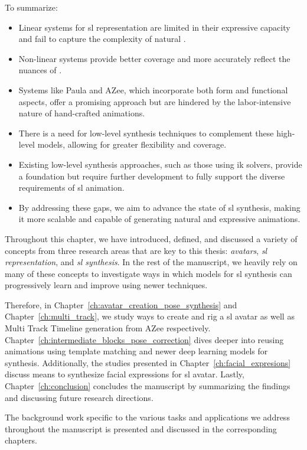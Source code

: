\documentclass[../../main.tex]{subfiles}
\begin{document}
To summarize:

\begin{itemize} 
  \item Linear systems for \gls{sl} representation are limited in their expressive capacity and fail to capture the complexity of natural .
  \item Non-linear systems provide better coverage and more accurately reflect the nuances of .
  \item Systems like Paula and AZee, which incorporate both form and functional aspects, offer a promising approach but are hindered by the labor-intensive nature of hand-crafted animations.
  \item There is a need for low-level synthesis techniques to complement these high-level models, allowing for greater flexibility and coverage.
  \item Existing low-level synthesis approaches, such as those using \gls{ik} solvers, provide a foundation but require further development to fully support the diverse requirements of \gls{sl} animation.
  \item By addressing these gaps, we aim to advance the state of \gls{sl} synthesis, making it more scalable and capable of generating natural and expressive animations.
\end{itemize}

Throughout this chapter, we have introduced, defined, and discussed a variety of concepts from three research areas that are key to this thesis: \textit{avatars}, \textit{\gls{sl} representation}, and \textit{\gls{sl} synthesis}. In the rest of the manuscript, we heavily rely on many of these concepts to investigate ways in which models for \gls{sl} synthesis can progressively learn and improve using newer techniques.

Therefore, in Chapter~\ref{ch:avatar_creation_pose_synthesis} and Chapter~\ref{ch:multi_track}, we study ways to create and rig a \gls{sl} avatar as well as Multi Track Timeline generation from AZee respectively. Chapter~\ref{ch:intermediate_blocks_pose_correction} dives deeper into reusing animations using template matching and newer deep learning models for synthesis. Additionally, the studies presented in Chapter~\ref{ch:facial_expresions} discuss means to synthesize facial expressions for \gls{sl} avatar. Lastly, Chapter~\ref{ch:conclusion} concludes the manuscript by summarizing the findings and discussing future research directions.

The background work specific to the various tasks and applications we address throughout the manuscript is presented and discussed in the corresponding chapters.
\end{document}
